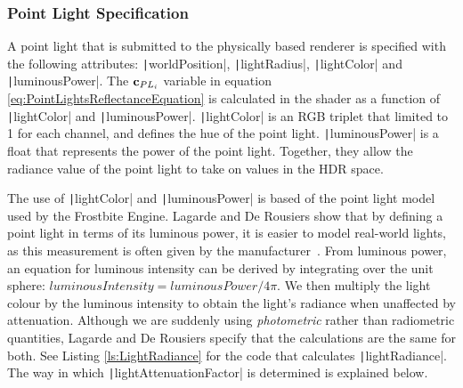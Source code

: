 
\subsubsection{Point Light Specification}

A point light that is submitted to the physically based renderer is specified with the following attributes: \texttt|worldPosition|, \texttt|lightRadius|, \texttt|lightColor| and \texttt|luminousPower|. The \begin{math}\mathbf{c}_{PL_i}\end{math} variable in equation \ref{eq:PointLightsReflectanceEquation} is calculated in the shader as a function of \texttt|lightColor| and \texttt|luminousPower|. \texttt|lightColor| is an RGB triplet that limited to 1 for each channel, and defines the hue of the point light. \texttt|luminousPower| is a float that represents the power of the point light. Together, they allow the radiance value of the point light to take on values in the HDR space.

The use of \texttt|lightColor| and \texttt|luminousPower| is based of the point light model used by the Frostbite Engine. Lagarde and De Rousiers show that by defining a point light in terms of its luminous power, it is easier to model real-world lights, as this measurement is often given by the manufacturer~\cite{MovingFrostbitetoPBR}. From luminous power, an equation for luminous intensity can be derived by integrating over the unit sphere: \begin{math}luminousIntensity = luminousPower / 4\pi\end{math}. We then multiply the light colour by the luminous intensity to obtain the light's radiance when unaffected by attenuation. Although we are suddenly using \textit{photometric} rather than radiometric quantities, Lagarde and De Rousiers specify that the calculations are the same for both. See Listing \ref{ls:LightRadiance} for the code that calculates \texttt|lightRadiance|. The way in which \texttt|lightAttenuationFactor| is determined is explained below.

